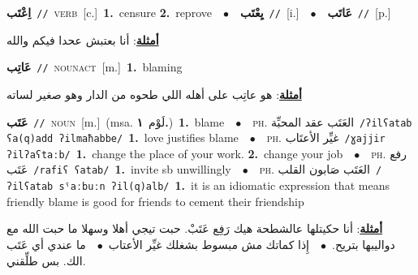 \documentclass[10pt,a4paper,twoside]{article} %
\begin{document}
\begin{multicols}{2}
{{{{{{{{{{\setlength\topsep{0pt}\textbf{\foreignlanguage{arabic}{اِعْتَب}}\ {\color{gray}\texttt{//}\color{black}}\ \textsc{verb}\ [c.]\ \textbf{1.}~censure  \textbf{2.}~reprove\ \ $\bullet$\ \ \setlength\topsep{0pt}\textbf{\foreignlanguage{arabic}{يِعْتَب}}\ {\color{gray}\texttt{//}\color{black}}\ [i.]\ \ $\bullet$\ \ \setlength\topsep{0pt}\textbf{\foreignlanguage{arabic}{عَاتَب}}\ {\color{gray}\texttt{//}\color{black}}\ [p.]\  \begin{flushright}\color{gray}\foreignlanguage{arabic}{\textbf{\underline{\foreignlanguage{arabic}{أمثلة}}}: أنا بعتبش عحدا فيكم والله}\end{flushright}\color{black}} \vspace{2mm}

{\setlength\topsep{0pt}\textbf{\foreignlanguage{arabic}{عَاتِب}}\ {\color{gray}\texttt{//}\color{black}}\ \textsc{noun\textunderscore act}\ [m.]\ \textbf{1.}~blaming\  \begin{flushright}\color{gray}\foreignlanguage{arabic}{\textbf{\underline{\foreignlanguage{arabic}{أمثلة}}}: هو عاتِب على أهله اللي طحوه من الدار وهو صغير لساته}\end{flushright}\color{black}} \vspace{2mm}

{\setlength\topsep{0pt}\textbf{\foreignlanguage{arabic}{عَتَب}}\ {\color{gray}\texttt{//}\color{black}}\ \textsc{noun}\ [m.]\ \color{gray}(msa. \foreignlanguage{arabic}{لَوْم}~\foreignlanguage{arabic}{\textbf{١.}})\color{black}\ \textbf{1.}~blame\ \ $\bullet$\ \ \textsc{ph.} \color{gray} \foreignlanguage{arabic}{العَتَب عقد المحبِّة}\color{black}\ {\color{gray}\texttt{/{\sffamily ʔilʕatab ʕa(q)add ʔilmaħabbe}/}\color{black}}\ \textbf{1.}~love justifies blame\ \ $\bullet$\ \ \textsc{ph.} \color{gray} \foreignlanguage{arabic}{غيِّر الأعتَاب}\color{black}\ {\color{gray}\texttt{/{\sffamily ɣajjir ʔilʔaʕtaːb}/}\color{black}}\ \textbf{1.}~change the place of your work.  \textbf{2.}~change your job\ \ $\bullet$\ \ \textsc{ph.} \color{gray} \foreignlanguage{arabic}{رفع عَتَب}\color{black}\ {\color{gray}\texttt{/{\sffamily rafiʕ ʕatab}/}\color{black}}\ \textbf{1.}~invite sb unwillingly\ \ $\bullet$\ \ \textsc{ph.} \color{gray} \foreignlanguage{arabic}{العَتَب صَابون القلب}\color{black}\ {\color{gray}\texttt{/{\sffamily ʔilʕatab sˤaːbuːn ʔil(q)alb}/}\color{black}}\ \textbf{1.}~it is an idiomatic expression that means friendly blame is good for friends to cement their friendship\  \begin{flushright}\color{gray}\foreignlanguage{arabic}{\textbf{\underline{\foreignlanguage{arabic}{أمثلة}}}: أنا حكيتلها عالشطحة هيك رَفِع عَتَبْ. حبت تيجي أهلا وسهلا ما حبت الله مع دواليبها بتريح.\ $\bullet$\ \  إِذا كماتك مش مبسوط بشغلك غيِّر الأعتاب\ $\bullet$\ \  ما عندي أي عَتَب الك. بس طلِّقني.}\end{flushright}\color{black}} \vspace{2mm}

}}}}}}}}}
\end{multicols}
\end{document}
